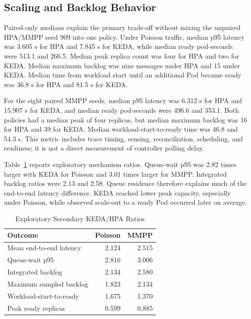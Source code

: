 \documentclass[conference]{IEEEtran}
\begin{document}
\subsection{Scaling and Backlog Behavior}

Paired-only medians explain the primary trade-off without mixing the unpaired
HPA/MMPP seed 909 into one policy. Under Poisson traffic, median p95 latency was
3.605 s for HPA and 7.845 s for KEDA, while median ready pod-seconds were 513.1
and 266.5. Median peak replica count was four for HPA and two for KEDA. Median
maximum backlog was nine messages under HPA and 15 under KEDA. Median time from
workload start until an additional Pod became ready was 36.8 s for HPA and 81.5
s for KEDA.

For the eight paired MMPP seeds, median p95 latency was 6.312 s for HPA and
15.907 s for KEDA, and median ready pod-seconds were 496.6 and 353.1. Both
policies had a median peak of four replicas, but median maximum backlog was 16
for HPA and 39 for KEDA. Median workload-start-to-ready time was 46.8 and 54.3
s. This metric includes trace timing, sensing, reconciliation, scheduling, and
readiness; it is not a direct measurement of controller polling delay.

Table~\ref{tab:secondary} reports exploratory mechanism ratios. Queue-wait p95
was 2.82 times larger with KEDA for Poisson and 3.01 times larger for MMPP.
Integrated backlog ratios were 2.13 and 2.58. Queue residence therefore explains
much of the end-to-end latency difference. KEDA reached lower peak capacity,
especially under Poisson, while observed scale-out to a ready Pod occurred
later on average.

\begin{table}[t]
  \caption{Exploratory Secondary KEDA/HPA Ratios}
  \label{tab:secondary}
  \centering
  \begin{tabular}{lrr}
    \toprule
    Outcome & Poisson & MMPP \\
    \midrule
    Mean end-to-end latency & 2.124 & 2.515 \\
    Queue-wait p95 & 2.816 & 3.006 \\
    Integrated backlog & 2.134 & 2.580 \\
    Maximum sampled backlog & 1.823 & 2.134 \\
    Workload-start-to-ready & 1.675 & 1.370 \\
    Peak ready replicas & 0.599 & 0.885 \\
    \bottomrule
  \end{tabular}
\end{table}
\end{document}
